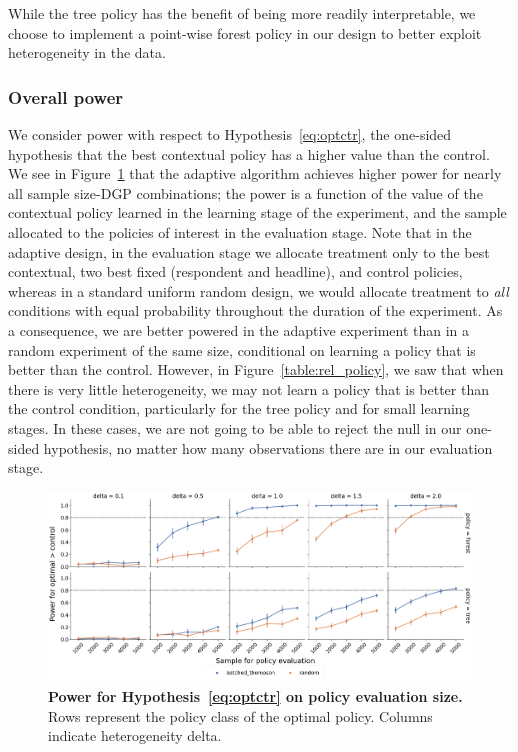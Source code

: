 \documentclass[letterpaper, 12pt, parskip=full,DIV=10]{scrartcl}
\begin{document}
{While the tree policy has the benefit of being more readily interpretable, we choose to implement a point-wise forest policy in our design to better exploit heterogeneity in the data. }


\subsubsection{Overall power}
We consider power with respect to Hypothesis~\ref{eq:optctr}, the one-sided hypothesis that the best contextual policy has a higher value than the control. We see in Figure~\ref{fig:power_control} that the adaptive algorithm achieves higher power for nearly all sample size-DGP combinations; the power is a function of the {value} of the contextual policy learned in the learning stage of the experiment, and the sample allocated to the policies of interest in the evaluation stage. Note that in the adaptive design, in the evaluation stage we allocate treatment only to the best contextual, two best fixed (respondent and headline), and control policies, whereas in a standard uniform random design, we would allocate treatment to \textit{all} conditions with equal probability throughout the duration of the experiment. As a consequence, we are better powered in the adaptive experiment than in a random experiment of the same size, conditional on learning a policy that is better than the control. However, in Figure~\ref{table:rel_policy}, we saw that when there is very little heterogeneity, we may not learn a policy that is better than the control condition, particularly for the tree policy and for small learning stages. In these cases, we are not going to be able to reject the null in our one-sided hypothesis, no matter how many observations there are in our evaluation stage. 



\begin{figure}[ht]
\centering
\includegraphics[width=\textwidth]{figures/power_against_control_policy.png}
\caption{\textbf{Power for Hypothesis~\ref{eq:optctr} on policy evaluation size.} Rows represent the policy class of the optimal policy.  Columns indicate heterogeneity delta. }
\label{fig:power_control}
\end{figure}\FloatBarrier
\end{document}
